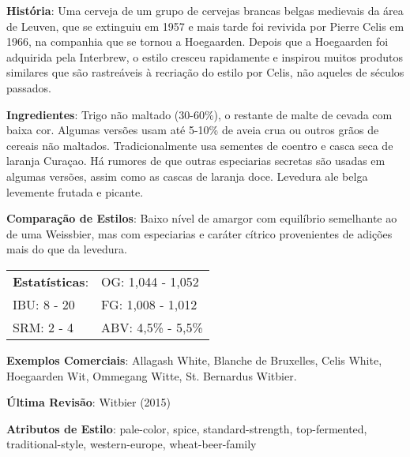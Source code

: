 \textbf{História}: Uma cerveja de um grupo de cervejas brancas belgas medievais da área de Leuven, que se extinguiu em 1957 e mais tarde foi revivida por Pierre Celis em 1966, na companhia que se tornou a Hoegaarden. Depois que a Hoegaarden foi adquirida pela Interbrew, o estilo cresceu rapidamente e inspirou muitos produtos similares que são rastreáveis à recriação do estilo por Celis, não aqueles de séculos passados.

\textbf{Ingredientes}: Trigo não maltado (30-60\%), o restante de malte de cevada com baixa cor. Algumas versões usam até 5-10\% de aveia crua ou outros grãos de cereais não maltados. Tradicionalmente usa sementes de coentro e casca seca de laranja Curaçao. Há rumores de que outras especiarias secretas são usadas em algumas versões, assim como as cascas de laranja doce. Levedura ale belga levemente frutada e picante.

\textbf{Comparação de Estilos}: Baixo nível de amargor com equilíbrio semelhante ao de uma Weissbier, mas com especiarias e caráter cítrico provenientes de adições mais do que da levedura.

\begin{tabular}{@{}p{35mm}p{35mm}@{}}
  \textbf{Estatísticas}: & OG: 1,044 - 1,052 \\
  IBU: 8 - 20  & FG: 1,008 - 1,012  \\
  SRM: 2 - 4  & ABV: 4,5\% - 5,5\%
\end{tabular}

\textbf{Exemplos Comerciais}: Allagash White, Blanche de Bruxelles, Celis White, Hoegaarden Wit, Ommegang Witte, St. Bernardus Witbier.

\textbf{Última Revisão}: Witbier (2015)

\textbf{Atributos de Estilo}: pale-color, spice, standard-strength, top-fermented, traditional-style, western-europe, wheat-beer-family

